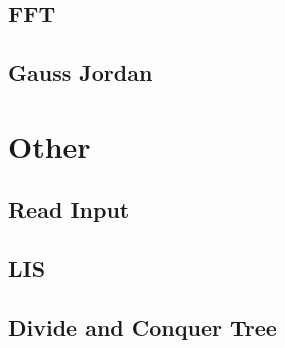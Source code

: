 \documentclass[a4paper,landscape]{article}
\begin{document}
\begin{multicols}{2}
\subsection{FFT}
	
\subsection{Gauss Jordan}
	

\section{Other}
\subsection{Read Input}
	
\subsection{LIS}
	
\subsection{Divide and Conquer Tree}
	

\end{multicols}
\end{document}

